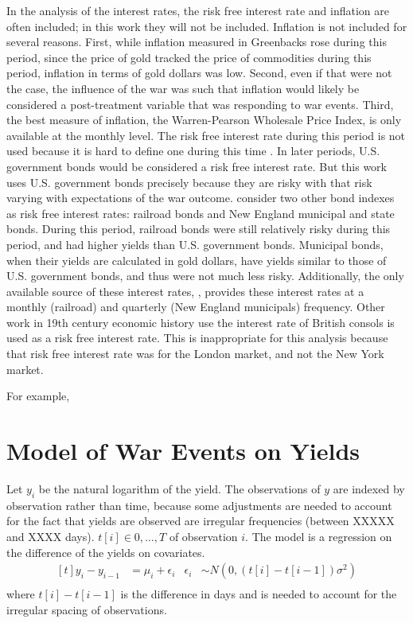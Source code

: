 In the analysis of the interest rates, the risk free interest rate and inflation are often included; in this work they will not be included.
Inflation is not included for several reasons.
First, while inflation measured in Greenbacks rose during this period, since the price of gold tracked the price of commodities during this period, inflation in terms of gold dollars was low\parencites{Mitchell1903}{Mitchell1908}. 
Second, even if that were not the case, the influence of the war was such that inflation would likely be considered a post-treatment variable that was responding to war events.
Third, the best measure of inflation, the Warren-Pearson Wholesale Price Index, is only available at the monthly level.
The risk free interest rate during this period is not used because it is hard to define one during this time \parencites{HomerSylla2005}.
In later periods, U.S. government bonds would be considered a risk free interest rate.
But this work uses U.S. government bonds precisely because they are risky with that risk varying with expectations of the war outcome.
\textcites{Macaulay1938}{HomerSylla2005} consider two other bond indexes as risk free interest rates: railroad bonds and New England municipal and state bonds.
During this period, railroad bonds were still relatively risky during this period, and had higher yields than U.S. government bonds.
Municipal bonds, when their yields are calculated in gold dollars, have yields similar to those of U.S. government bonds, and thus were not much less risky.
Additionally, the only available source of these interest rates, \textcite{Macaulay1938}, provides these interest rates at a monthly (railroad) and quarterly (New England municipals) frequency.
Other work in 19th century economic history use the interest rate of British consols is used as a risk free interest rate.
This is inappropriate for this analysis because that risk free interest rate was for the London market, and not the New York market.

For example, 


\section{Model of War Events on Yields}

Let $y_{i}$ be the natural logarithm of the yield.
The observations of $y$ are indexed by observation rather than time, because some adjustments are needed to account for the fact that yields are observed are irregular frequencies (between XXXXX and XXXX days).
$t[i] \in 0, \dots, T$ of observation $i$.
The model is a regression on the difference of the yields on covariates.
\begin{equation}
  \label{bonds_battles:eq:1}
  \begin{aligned}[t]
    y_{i} - y_{i - 1} &= \mu_{i} + \epsilon_{i} & \epsilon_{i} & \sim N(0, (t[i] - t[i - 1]) \sigma^{2}) \\
  \end{aligned}
\end{equation}
where $t[i] - t[i - 1]$ is the difference in days and is needed to account for the irregular spacing of observations.

